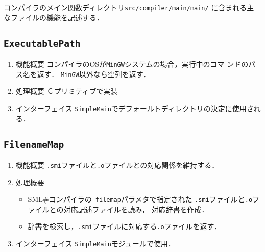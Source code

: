 \documentclass{jbook}
\newcommand{\smlsharp}{SML\#}
\newcommand{\code}[1]{\mbox{\large\tt #1}}
\begin{document}
\ifjp%
	コンパイラのメイン関数ディレクトリ\code{src/compiler/main/main/}
に含まれる主なファイルの機能を記述する．

\subsection{\code{ExecutablePath}}
\begin{enumerate}
\item 機能概要 コンパイラのOSが\code{MinGW}システムの場合，実行中のコマ
ンドのパス名を返す．
	\code{MinGW}以外なら空列を返す．
\item 処理概要 Ｃプリミティブで実装
\item インターフェイス \code{SimpleMain}でデフォールトディレクトリの決定に使用される．
\end{enumerate}
	
\subsection{\code{FilenameMap}}
\begin{enumerate}
\item 機能概要 \code{.smi}ファイルと\code{.o}ファイルとの対応関係を維持する．
\item 処理概要 
\begin{itemize}
\item \smlsharp{}コンパイラの\code{-filemap}パラメタで指定された
\code{.smi}ファイルと\code{.o}ファイルとの対応記述ファイルを読み，
対応辞書を作成．
\item 辞書を検索し，\code{.smi}ファイルに対応する\code{.o}ファイルを返す．
\end{itemize}
\item インターフェイス \code{SimpleMain}モジュールで使用．
\end{enumerate}
\end{document}
